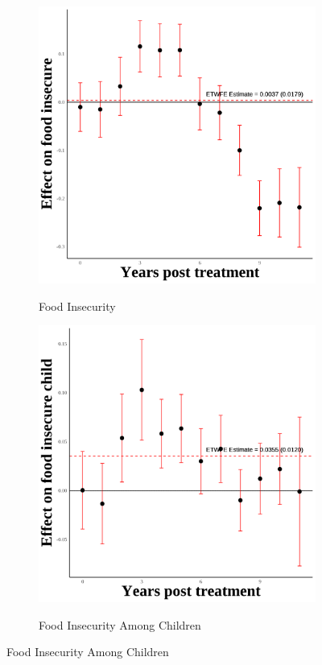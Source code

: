 \documentclass[12pt,english]{article}
\begin{document}
\begin{figure}[H]
  \begin{subfigure}[b]{0.3\textwidth}
    \centering
    \caption{Food Insecurity}
    \includegraphics[width=\linewidth]{figures/plot07-food_insecure_event_study.png}
    \label{fig:food-insecure}
  \end{subfigure}
  \hfill
  \begin{subfigure}[b]{0.3\textwidth}
    \centering
    \caption{Food Insecurity Among Children}
    \includegraphics[width=\linewidth]{figures/plot08-food_insecure_child_event_study.png}
    \label{fig:food-insecure-child}
  \end{subfigure}

\end{figure}
\end{document}
